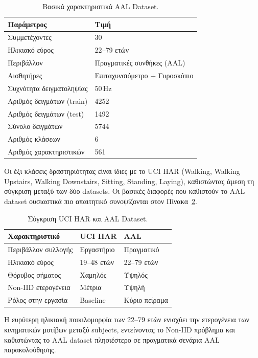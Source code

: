 \begin{table}[H]
    \centering
    \caption{Βασικά χαρακτηριστικά AAL Dataset.}
    \label{tab:aal_dataset}
    \begin{tabular}{ll}
        \toprule
        \textbf{Παράμετρος} & \textbf{Τιμή} \\
        \midrule
        Συμμετέχοντες          & 30 \\
        Ηλικιακό εύρος         & 22–79 ετών \\
        Περιβάλλον             & Πραγματικές συνθήκες (AAL) \\
        Αισθητήρες             & Επιταχυνσιόμετρο + Γυροσκόπιο \\
        Συχνότητα δειγματοληψίας & 50\,Hz \\
        Αριθμός δειγμάτων (train) & 4252 \\
        Αριθμός δειγμάτων (test)  & 1492 \\
        Σύνολο δειγμάτων       & 5744 \\
        Αριθμός κλάσεων        & 6 \\
        Αριθμός χαρακτηριστικών & 561 \\
        \bottomrule
    \end{tabular}
\end{table}

Οι έξι κλάσεις δραστηριότητας είναι ίδιες με το UCI HAR (Walking,
Walking Upstairs, Walking Downstairs, Sitting, Standing, Laying),
καθιστώντας άμεση τη σύγκριση μεταξύ των δύο datasets. Οι βασικές
διαφορές που καθιστούν το AAL dataset ουσιαστικά πιο απαιτητικό
συνοψίζονται στον Πίνακα~\ref{tab:datasets_comparison}.

\begin{table}[H]
    \centering
    \caption{Σύγκριση UCI HAR και AAL Dataset.}
    \label{tab:datasets_comparison}
    \begin{tabular}{lll}
        \toprule
        \textbf{Χαρακτηριστικό} & \textbf{UCI HAR} & \textbf{AAL} \\
        \midrule
        Περιβάλλον συλλογής & Εργαστήριο & Πραγματικό \\
        Ηλικιακό εύρος      & 19–48 ετών & 22–79 ετών \\
        Θόρυβος σήματος     & Χαμηλός & Υψηλός \\
        Non-IID ετερογένεια & Μέτρια & Υψηλή \\
        Ρόλος στην εργασία  & Baseline & Κύριο πείραμα \\
        \bottomrule
    \end{tabular}
\end{table}

Η ευρύτερη ηλικιακή ποικιλομορφία των 22–79 ετών ενισχύει την
ετερογένεια των κινηματικών μοτίβων μεταξύ subjects, εντείνοντας
το Non-IID πρόβλημα και καθιστώντας το AAL dataset πλησιέστερο
σε πραγματικά σενάρια AAL παρακολούθησης.
